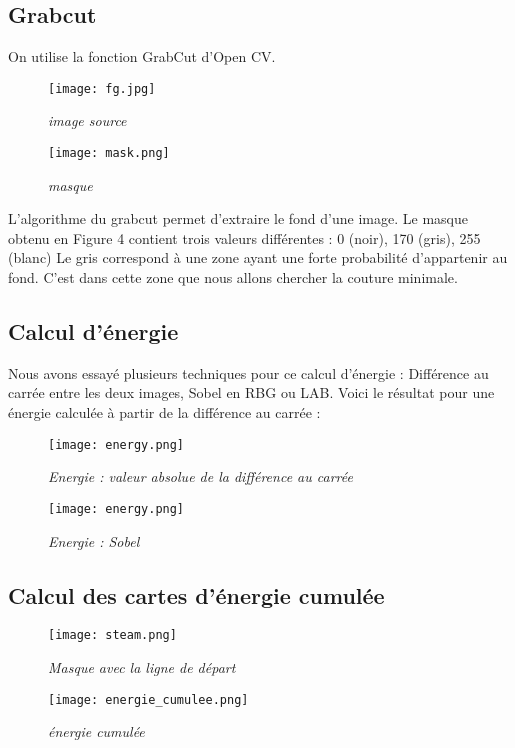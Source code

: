 \documentclass[a4paper]{article}
\begin{document}
\subsection{Grabcut}      
On utilise la fonction GrabCut d'Open CV.
\begin{figure}[!h]
	\begin{minipage}[b]{0.40\linewidth}
    	\centering \texttt{[image: fg.jpg]}
    	\caption{\it image source}
    \end{minipage}\hfill
    \begin{minipage}[b]{0.40\linewidth}
    	\centering \texttt{[image: mask.png]}
    	\caption{\it masque}
    \end{minipage}\hfill
\end{figure}

L'algorithme du grabcut permet d'extraire le fond d'une image. 
Le masque obtenu en Figure 4 contient trois valeurs différentes : 0 (noir), 170 (gris), 255 (blanc) Le gris correspond à une zone ayant une forte probabilité d'appartenir au fond. C'est dans cette zone que nous allons chercher la couture minimale.

\subsection{Calcul d'énergie}

Nous avons essayé plusieurs techniques pour ce calcul d'énergie : Différence au carrée entre les deux images, Sobel en RBG ou LAB.
Voici le résultat pour une énergie calculée à partir de la différence au carrée :
\begin{figure}[!h]
	\begin{minipage}[b]{0.40\linewidth}
    	\centering \texttt{[image: energy.png]}
    	\caption{\it Energie : valeur absolue de la différence au carrée}
    \end{minipage}\hfill\begin{minipage}[b]{0.40\linewidth}
    	\centering \texttt{[image: energy.png]}
    	\caption{\it Energie : Sobel}
    \end{minipage}\hfill
\end{figure}


\subsection{Calcul des cartes d'énergie cumulée}
\begin{figure}[!h]
	\begin{minipage}[b]{0.40\linewidth}
    	\centering \texttt{[image: steam.png]}
    	\caption{\it Masque avec la ligne de départ}
    \end{minipage}\hfill
    \begin{minipage}[b]{0.40\linewidth}
    	\centering \texttt{[image: energie\_cumulee.png]}
    	\caption{\it énergie cumulée}
    \end{minipage}\hfill
\end{figure}
\end{document}
